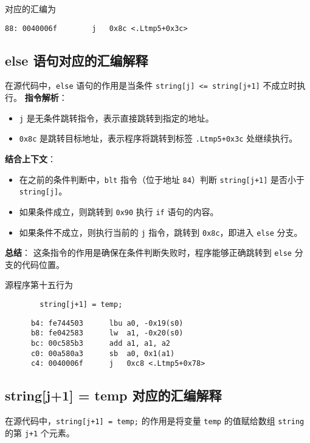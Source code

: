\documentclass{ctexart}
\begin{document}
对应的汇编为
\begin{verbatim}
88: 0040006f     	j	0x8c <.Ltmp5+0x3c>
\end{verbatim}

\subsection*{else 语句对应的汇编解释}
在源代码中，\texttt{else} 语句的作用是当条件 \texttt{string[j] <= string[j+1]} 不成立时执行。
\textbf{指令解析}：
\begin{itemize}
    \item \texttt{j} 是无条件跳转指令，表示直接跳转到指定的地址。
    \item \texttt{0x8c} 是跳转目标地址，表示程序将跳转到标签 \texttt{.Ltmp5+0x3c} 处继续执行。
\end{itemize}

\textbf{结合上下文}：
\begin{itemize}
    \item 在之前的条件判断中，\texttt{blt} 指令（位于地址 \texttt{84}）判断 \texttt{string[j+1]} 是否小于 \texttt{string[j]}。
    \item 如果条件成立，则跳转到 \texttt{0x90} 执行 \texttt{if} 语句的内容。
    \item 如果条件不成立，则执行当前的 \texttt{j} 指令，跳转到 \texttt{0x8c}，即进入 \texttt{else} 分支。
\end{itemize}

\textbf{总结}：
这条指令的作用是确保在条件判断失败时，程序能够正确跳转到 \texttt{else} 分支的代码位置。

源程序第十五行为
\begin{verbatim}
        string[j+1] = temp;
\end{verbatim}

\begin{verbatim}
      b4: fe744503     	lbu	a0, -0x19(s0)
      b8: fe042583     	lw	a1, -0x20(s0)
      bc: 00c585b3     	add	a1, a1, a2
      c0: 00a580a3     	sb	a0, 0x1(a1)
      c4: 0040006f     	j	0xc8 <.Ltmp5+0x78>
\end{verbatim}

\subsection*{string[j+1] = temp 对应的汇编解释}
在源代码中，\texttt{string[j+1] = temp;} 的作用是将变量 \texttt{temp} 的值赋给数组 \texttt{string} 的第 \texttt{j+1} 个元素。
\end{document}
